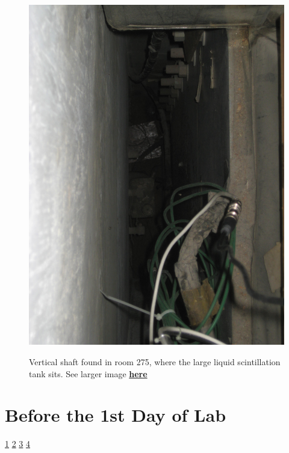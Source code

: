 \documentclass{../lab}
\begin{document}
\begin{figure}[h]
\begin{minipage}{0.33\textwidth}
    \href{http://experimentationlab.berkeley.edu/sites/default/files/images/MUO_Tank_3565.jpg}{\includegraphics[width=\linewidth,keepaspectratio]{images/MUO_Tank_3565.jpg}}
    \caption{Vertical shaft found in room 275, where the large liquid scintillation tank sits. See larger image \href{http://experimentationlab.berkeley.edu/sites/default/files/images/MUO_Tank_3565.jpg}{\textbf{here}}}
\end{minipage}
\end{figure}

\newpage

\section{Before the 1st Day of Lab}

\signatures \hyperlink{Oscilloscope (TDS 360)}{ 1} \hyperlink{Apparatus in the other room}{ 2} \hyperlink{Trigger Rate}{ 3} \hyperlink{Time Difference Data}{ 4}
\end{document}
